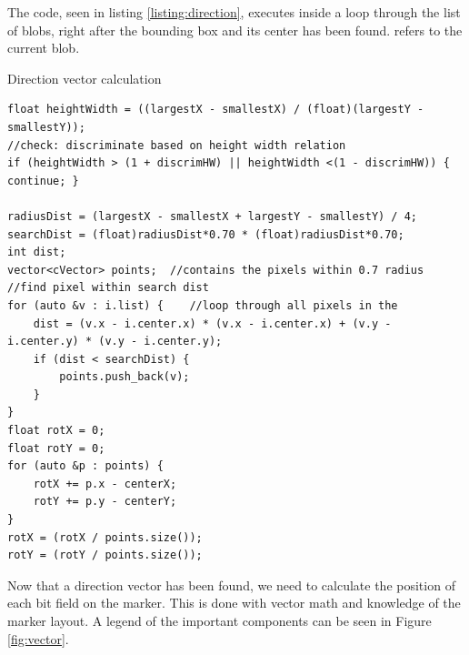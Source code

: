  The code, seen in listing \ref{listing:direction}, executes inside a loop through the list of blobs, right after the bounding box and its center has been found.  refers to the current blob.
\begin{listing}[H]
	\caption{Direction vector calculation}
	\begin{verbatim}
float heightWidth = ((largestX - smallestX) / (float)(largestY - smallestY));
//check: discriminate based on height width relation
if (heightWidth > (1 + discrimHW) || heightWidth <(1 - discrimHW)) { continue; }	

radiusDist = (largestX - smallestX + largestY - smallestY) / 4;
searchDist = (float)radiusDist*0.70 * (float)radiusDist*0.70;
int dist;
vector<cVector> points;  //contains the pixels within 0.7 radius
//find pixel within search dist
for (auto &v : i.list) {	//loop through all pixels in the
	dist = (v.x - i.center.x) * (v.x - i.center.x) + (v.y - i.center.y) * (v.y - i.center.y);
	if (dist < searchDist) {
		points.push_back(v);
	}
}
float rotX = 0;
float rotY = 0;
for (auto &p : points) {
	rotX += p.x - centerX;
	rotY += p.y - centerY;
}
rotX = (rotX / points.size());
rotY = (rotY / points.size());
	\end{verbatim}
	\label{listing:direction}
\end{listing}
Now that a direction vector has been found, we need to calculate the position of each bit field on the marker. This is done with vector math and knowledge of the marker layout. A legend of the important components can be seen in Figure \ref{fig:vector}.

